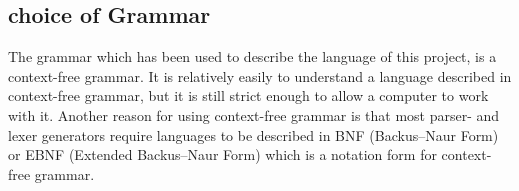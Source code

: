 \subsection{choice of Grammar}
The grammar which has been used to describe the language of this project, is a context-free grammar. It is relatively easily to understand a language described in context-free grammar, but it is still strict enough to allow a computer to work with it. Another reason for using context-free grammar is that most parser- and lexer generators require languages to be described in BNF (Backus–Naur Form) or EBNF (Extended Backus–Naur Form) which is a notation form for context-free grammar.
